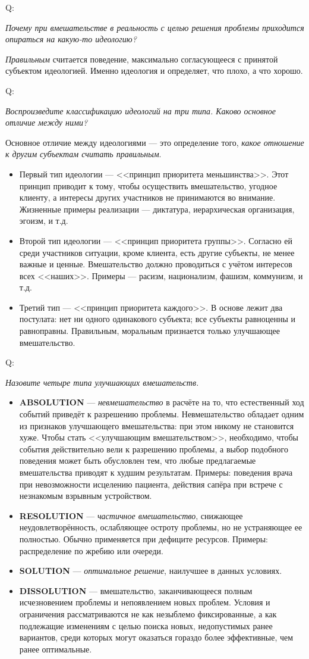 \documentclass{article}
\newcommand{\note}[1]{\textit{#1}}
\newcommand{\important}[1]{\textbf{#1}}
\newcommand{\question}[2]{
	\begin{flushright}
		Q:\hspace{2ex}\vline\hspace{2ex}
		\begin{minipage}{0.9\textwidth}
			\large
			\textit{#1}
		\end{minipage}
	\end{flushright}
	\begin{center}
		\begin{minipage}{0.95\textwidth}
			#2
		\end{minipage}
	\end{center}
	}
\begin{document}
\question{Почему при вмешательстве в реальность с целью решения проблемы приходится опираться на какую-то идеологию?}{\note{Правильным} считается поведение, максимально согласующееся с принятой субъектом идеологией. Именно идеология и определяет, что плохо, а что хорошо.}
\question{Воспроизведите классификацию идеологий на три типа. Каково основное отличие между ними?}{Основное отличие между идеологиями --- это определение того, \note{какое отношение к другим субъектам считать правильным}.
	\begin{itemize}
		\item Первый тип идеологии --- <<принцип приоритета меньшинства>>. Этот принцип приводит к тому, чтобы осуществить вмешательство, угодное клиенту, а интересы других участников не принимаются во внимание. Жизненные примеры реализации --- диктатура, иерархическая организация, эгоизм, и т.д.
		\item Второй тип идеологии --- <<принцип приоритета группы>>. Согласно ей среди участников ситуации, кроме клиента, есть другие субъекты, не менее важные и ценные. Вмешательство должно проводиться с учётом интересов всех <<наших>>. Примеры --- расизм, национализм, фашизм, коммунизм, и т.д.
		\item Третий тип --- <<принцип приоритета каждого>>. В основе лежит два постулата: нет ни одного одинакового субъекта; все субъекты равноценны и равноправны. Правильным, моральным признается только улучшающее вмешательство.
	\end{itemize}}
\question{Назовите четыре типа улучшающих вмешательств.}{
	\begin{itemize}
		\item \important{ABSOLUTION} --- \note{невмешательство} в расчёте на то, что естественный ход событий приведёт к разрешению проблемы. Невмешательство обладает одним из признаков улучшающего вмешательства: при этом никому не становится хуже. Чтобы стать <<улучшающим вмешательством>>, необходимо, чтобы события действительно вели к разрешению проблемы, а выбор подобного поведения может быть обусловлен тем, что любые предлагаемые вмешательства приводят к худшим результатам. Примеры: поведения врача при невозможности исцелению пациента, действия сапёра при встрече с незнакомым взрывным устройством.
		\item \important{RESOLUTION} --- \note{частичное вмешательство}, снижающее неудовлетворённость, ослабляющее остроту проблемы, но не устраняющее ее полностью. Обычно применяется при дефиците ресурсов. Примеры: распределение по жребию или очереди.
		\item \important{SOLUTION} --- \note{оптимальное решение}, наилучшее в данных условиях. 
		\item \important{DISSOLUTION} --- вмешательство, заканчивающееся полным исчезновением проблемы и непоявлением новых проблем. Условия и ограничения рассматриваются не как незыблемо фиксированные, а как подлежащие изменениям с целью поиска новых, недопустимых ранее вариантов, среди которых могут оказаться гораздо более эффективные, чем ранее оптимальные.
	\end{itemize}}
\end{document}
